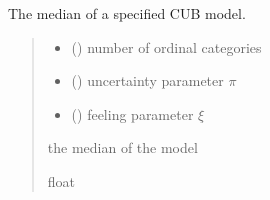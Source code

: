 \documentclass[letterpaper,10pt,english]{sphinxmanual}
\begin{document}
\begin{fulllineitems}
\label{\detokenize{cubmods:cubmods.cub.median}}
\pysigstartsignatures
{}
\pysigstopsignatures
\sphinxAtStartPar
The median of a specified CUB model.
\begin{quote}\begin{description}
\begin{itemize}
\item {} 
\sphinxAtStartPar
{} () \textendash{} number of ordinal categories

\item {} 
\sphinxAtStartPar
{} () \textendash{} uncertainty parameter \(\pi\)

\item {} 
\sphinxAtStartPar
{} () \textendash{} feeling parameter \(\xi\)

\end{itemize}

\sphinxAtStartPar
the median of the model

\sphinxAtStartPar
float

\end{description}\end{quote}

\end{fulllineitems}

\end{document}
